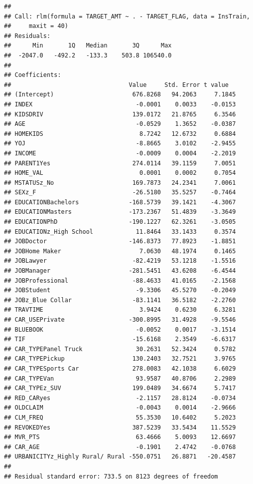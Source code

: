 \documentclass[]{article}
\begin{document}
\begin{verbatim}
## 
## Call: rlm(formula = TARGET_AMT ~ . - TARGET_FLAG, data = InsTrain, 
##     maxit = 40)
## Residuals:
##      Min       1Q   Median       3Q      Max 
##  -2047.0   -492.2   -133.3    503.8 106540.0 
## 
## Coefficients:
##                                 Value     Std. Error t value  
## (Intercept)                      676.8268   94.2063     7.1845
## INDEX                             -0.0001    0.0033    -0.0153
## KIDSDRIV                         139.0172   21.8765     6.3546
## AGE                               -0.0529    1.3652    -0.0387
## HOMEKIDS                           8.7242   12.6732     0.6884
## YOJ                               -8.8665    3.0102    -2.9455
## INCOME                            -0.0009    0.0004    -2.2019
## PARENT1Yes                       274.0114   39.1159     7.0051
## HOME_VAL                           0.0001    0.0002     0.7054
## MSTATUSz_No                      169.7873   24.2341     7.0061
## SEXz_F                           -26.5180   35.5257    -0.7464
## EDUCATIONBachelors              -168.5739   39.1421    -4.3067
## EDUCATIONMasters                -173.2367   51.4839    -3.3649
## EDUCATIONPhD                    -190.1227   62.3261    -3.0505
## EDUCATIONz_High School            11.8464   33.1433     0.3574
## JOBDoctor                       -146.8373   77.8923    -1.8851
## JOBHome Maker                      7.0630   48.1974     0.1465
## JOBLawyer                        -82.4219   53.1218    -1.5516
## JOBManager                      -281.5451   43.6208    -6.4544
## JOBProfessional                  -88.4633   41.0165    -2.1568
## JOBStudent                        -9.3306   45.5270    -0.2049
## JOBz_Blue Collar                 -83.1141   36.5182    -2.2760
## TRAVTIME                           3.9424    0.6230     6.3281
## CAR_USEPrivate                  -300.8995   31.4928    -9.5546
## BLUEBOOK                          -0.0052    0.0017    -3.1514
## TIF                              -15.6168    2.3549    -6.6317
## CAR_TYPEPanel Truck               30.2631   52.3424     0.5782
## CAR_TYPEPickup                   130.2403   32.7521     3.9765
## CAR_TYPESports Car               278.0083   42.1038     6.6029
## CAR_TYPEVan                       93.9587   40.8706     2.2989
## CAR_TYPEz_SUV                    199.0489   34.6674     5.7417
## RED_CARyes                        -2.1157   28.8124    -0.0734
## OLDCLAIM                          -0.0043    0.0014    -2.9666
## CLM_FREQ                          55.3530   10.6402     5.2023
## REVOKEDYes                       387.5239   33.5434    11.5529
## MVR_PTS                           63.4666    5.0093    12.6697
## CAR_AGE                           -0.1901    2.4742    -0.0768
## URBANICITYz_Highly Rural/ Rural -550.0751   26.8871   -20.4587
## 
## Residual standard error: 733.5 on 8123 degrees of freedom
\end{verbatim}
\end{document}
